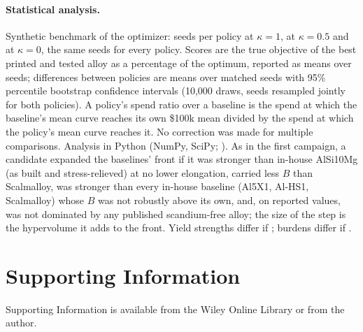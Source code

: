 \documentclass[11pt]{article}
\begin{document}
\paragraph{Statistical analysis.}
 Synthetic
benchmark of the optimizer:  seeds per policy at $\kappa=1$,
 at $\kappa=0.5$ and  at $\kappa=0$, the same seeds for
every policy. Scores are
the true objective of the best printed and tested alloy as a percentage of the
optimum, reported as means over seeds; differences between policies are means
over matched seeds with 95\% percentile bootstrap confidence intervals (10,000
draws, seeds resampled jointly for both policies). A policy's spend ratio over a
baseline is the spend at which the baseline's mean curve reaches its own \$100k
mean divided by the spend at which the policy's mean curve reaches it. No correction was made for
multiple comparisons. Analysis in Python (NumPy, SciPy;
). As in the first
campaign, a candidate expanded the baselines' front if it was stronger than in-house
AlSi10Mg (as built and stress-relieved) at no lower elongation, carried less $B$ than
Scalmalloy, was stronger than every in-house baseline (Al5X1, Al-HS1, Scalmalloy)
whose $B$ was not robustly above its own, and, on reported values, was not dominated
by any published scandium-free alloy; the size of the step is the hypervolume it
adds to the front.
Yield strengths differ if ; burdens differ if .

\section*{Supporting Information}
Supporting Information is available from the Wiley Online Library or from the author.
\end{document}
